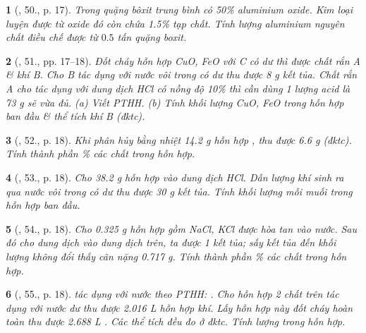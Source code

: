 \documentclass{article}
\newtheorem{baitoan}{}
\begin{document}
\begin{baitoan}[\cite{An_400_BT_Hoa_Hoc_9}, 50., p. 17]
	Trong quặng bôxit trung bình có {\rm50\%} aluminium oxide. Kim loại luyện được từ oxide đó còn chứa {\rm1.5\%} tạp chất. Tính lượng aluminium nguyên chất điều chế được  từ $0.5$ tấn quặng boxit.
\end{baitoan}

\begin{baitoan}[\cite{An_400_BT_Hoa_Hoc_9}, 51., pp. 17--18]
	Đốt cháy hỗn hợp {\rm CuO, FeO} với {\rm C} có dư thì được chất rắn A \& khí B. Cho B tác dụng với nước vôi trong có dư thu được {\rm8 g} kết tủa. Chất rắn A cho tác dụng với dung dịch {\rm HCl} có nồng độ {\rm10\%} thì cần dùng 1 lượng acid là {\rm73 g} sẽ vừa đủ. (a) Viết {\rm PTHH}. (b) Tính khối lượng {\rm CuO, FeO} trong hỗn hợp ban đầu \& thể tích khí B (đktc).
\end{baitoan}

\begin{baitoan}[\cite{An_400_BT_Hoa_Hoc_9}, 52., p. 18]
	Khi phân hủy bằng nhiệt {\rm14.2 g} hỗn hợp {\rm{}}, thu được {\rm6.6 g } (đktc). Tính thành phần {\rm\%} các chất trong hỗn hợp.
\end{baitoan}

\begin{baitoan}[\cite{An_400_BT_Hoa_Hoc_9}, 53., p. 18]
	Cho {\rm38.2 g} hỗn hợp {\rm{}} vào dung dịch {\rm HCl}. Dẫn lượng khí sinh ra qua nước vôi trong có dư thu được {\rm30 g} kết tủa. Tính khối lượng mỗi muối trong hỗn hợp ban đầu.
\end{baitoan}

\begin{baitoan}[\cite{An_400_BT_Hoa_Hoc_9}, 54., p. 18]
	Cho {\rm0.325 g} hỗn hợp gồm {\rm NaCl, KCl} được hòa tan vào nước. Sau đó cho dung dịch {\rm{}} vào dung dịch trên, ta được 1 kết tủa; sấy kết tủa đến khối lượng không đổi thấy cân nặng {\rm0.717 g}. Tính thành phần {\rm\%} các chất trong hỗn hợp.
\end{baitoan}

\begin{baitoan}[\cite{An_400_BT_Hoa_Hoc_9}, 55., p. 18]
	{\rm{}} tác dụng với nước theo {\rm PTHH: }. Cho hỗn hợp 2 chất trên tác dụng với nước dư thu được {\rm2.016 L} hỗn hợp khí. Lấy hỗn hợp này đốt cháy hoàn toàn thu được {\rm2.688 L }. Các thể tích đều đo ở đktc. Tính lượng {\rm{}} trong hỗn hợp.
\end{baitoan}
\end{document}
